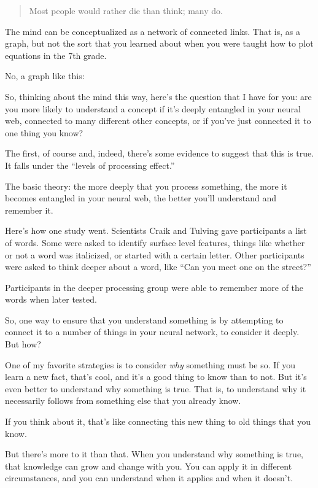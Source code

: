 \begin{quote}
  Most people would rather die than think; many do.
\end{quote}

The mind can be conceptualized as a network of connected links. That is, as a
graph, but not the sort that you learned about when you were taught how to plot
equations in the 7th grade.

No, a graph like this:


So, thinking about the mind this way, here's the question that I have for you:
are you more likely to understand a concept if it's deeply entangled in your
neural web, connected to many different other concepts, or if you've just
connected it to one thing you know?

The first, of course and, indeed, there's some evidence to suggest that this is
true. It falls under the ``levels of processing effect.''

The basic theory: the more deeply that you process something, the more it
becomes entangled in your neural web, the better you'll understand and remember
it.

Here's how one study went. Scientists Craik and Tulving gave participants a list
of words. Some were asked to identify surface level features, things like
whether or not a word was italicized, or started with a certain letter. Other
participants were asked to think deeper about a word, like ``Can you meet
one on the street?''

Participants in the deeper processing group were able to remember more of the
words when later tested.

So, one way to ensure that you understand something is by attempting to connect
it to a number of things in your neural network, to consider it deeply. But how?

One of my favorite strategies is to consider \textit{why} something must be
so. If you learn a new fact, that's cool, and it's a good thing to know than to
not. But it's even better to understand why something is true. That is, to
understand why it necessarily follows from something else that you already know.

If you think about it, that's like connecting this new thing to old things that
you know.

But there's more to it than that. When you understand why something is true,
that knowledge can grow and change with you. You can apply it in different
circumstances, and you can understand when it applies and when it doesn't.

